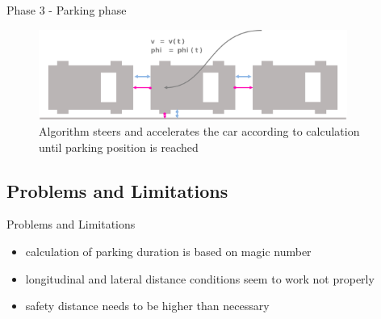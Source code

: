 \documentclass[aspectratio=169]{beamer}
\begin{document}
  \begin{frame}{Phase 3 - Parking phase}
  	\begin{figure} [ht]
  		\centering
  		\includegraphics[width=0.9\textwidth]{david_images/Parked.png}
  		\caption{\tiny Algorithm steers and accelerates the car according to calculation until parking position is reached}
	\end{figure}
  \end{frame}
  
  \subsection{Problems and Limitations}
  \begin{frame}{Problems and Limitations}
  	\begin{itemize}
  		\item<1-> calculation of parking duration is based on magic number
  		\item<2-> longitudinal and lateral distance conditions seem to work not properly
  		\item<3-> safety distance needs to be higher than necessary
  	\end{itemize}
  \end{frame}
  
\end{document}
